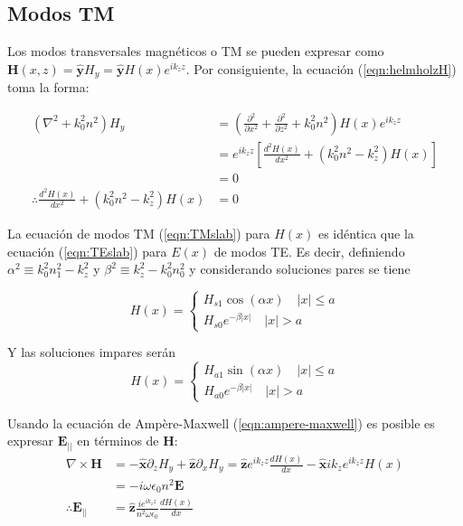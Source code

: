 \subsection{Modos TM}
Los modos transversales magnéticos o TM se pueden expresar como $\textbf{H}(x,z) =\mathbf{\hat{y}} H_y= \mathbf{\hat{y}} H(x)e^{i k_z z }$. Por consiguiente, la ecuación (\ref{eqn:helmholzH}) toma la forma:

\begin{align}
	(\nabla^2 + k_0^2 n^2) H_y
	&= \left(\frac{\partial^2}{\partial x^2} + \frac{\partial^2}{\partial z^2} + k_0^2n^2\right) H(x)e^{ik_z z }
	\nonumber
	\\
&= e^{ik_z z}\left[\frac{d^2  H(x)}{dx^2}  + (k_0^2n^2 -  k_z^2)H(x) \right]
\nonumber	
	\\	
	&= 0 
	\nonumber	
	\\
	\therefore 
	\frac{d^2  H(x)}{dx^2}  + (k_0^2n^2 -  k_z^2)H(x) &= 0
	\label{eqn:TMslab}
\end{align} 

La ecuación de modos TM (\ref{eqn:TMslab}) para $H(x)$ es idéntica que la ecuación (\ref{eqn:TEslab}) para $E(x)$ de modos TE. Es decir, definiendo $\alpha^2\equiv k_0^2n_1^2-k_z^2$ y $\beta^2\equiv k_z^2 - k_0^2n_0^2$ y considerando soluciones pares se tiene

\begin{equation*}
	H(x) = \left\{\begin{matrix}
	H_{s1}\cos(\alpha x)\quad |x|\le a
	\\
	H_{s0}e^{-\beta|x|} \quad |x|>a
	\end{matrix}\right.
\end{equation*}

Y las soluciones impares serán
\begin{equation*}
	H(x) = \left\{\begin{matrix}
	H_{a1}\sin(\alpha x)\quad |x|\le a
	\\
	H_{a0}e^{-\beta|x|} \quad |x|>a
	\end{matrix}\right.
\end{equation*}

Usando la ecuación de Ampère-Maxwell (\ref{eqn:ampere-maxwell}) es posible es expresar $\textbf{E}_{||}$ en términos de $\textbf{H}$:
\begin{align*}
	\nabla\times\textbf{H} &= -\mathbf{\hat{x}} \partial_z H_y+ \mathbf{\hat{z}} \partial_x H_y = \mathbf{\hat{z}} e^{i k_z z }\frac{d H(x)}{dx} - \mathbf{\hat{x}} ik_z  e^{i k_z z } H(x)  
	\\	
	&= -i\omega\epsilon_0 n^2 \textbf{E}
	\\
	\therefore \textbf{E}_{||} &= \mathbf{\hat{z}} \frac{ie^{i k_z z }}{n^2 \omega \epsilon_0} \frac{d H(x)}{dx}
\end{align*} 

